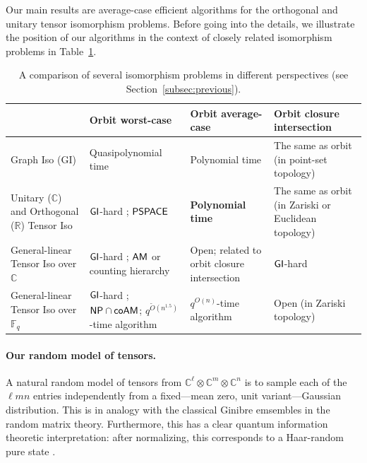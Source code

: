 \documentclass[11pt]{article}
\numberwithin{equation}{section}
\theoremstyle{remark}
\newcommand{\F}{\mathbb{F}}
\newcommand{\C}{\mathbb{C}}
\newcommand{\CC}{\mathbb{C}}
\newcommand{\RR}{\mathbb{R}}
\newcommand{\ccPSPACE}{\textsf{\upshape PSPACE}}
\newcommand{\ccNP}{\textsf{\upshape NP}}
\newcommand{\ccAM}{\textsf{\upshape AM}}
\newcommand{\cccoAM}{\textsf{\upshape coAM}}
\newcommand{\ccGI}{\textsf{\upshape GI}}
\begin{document}
Our main results are average-case efficient algorithms for the orthogonal and unitary tensor isomorphism problems. Before going into the details, we illustrate the position of our algorithms in the context of closely related isomorphism problems in Table~\ref{tab:comparison}.
\begin{table}[H]
\centering
\small
\setlength{\tabcolsep}{5pt}
\renewcommand{\arraystretch}{1.2}

\begin{tabularx}{\textwidth}{|
  >{\raggedright\arraybackslash}p{}|
  >{\raggedright\arraybackslash}p{}|
  >{\raggedright\arraybackslash}p{}|
  >{\raggedright\arraybackslash}p{}|}
\hline
 & \textbf{Orbit worst-case} & \textbf{Orbit average-case} & \textbf{Orbit closure intersection} \\
\hline
Graph Iso (GI) &
Quasipolynomial time \cite{Bab16} &
Polynomial time \cite{BES80,DBLP:conf/focs/BabaiK79,anastos2025smoothed} &
The same as orbit (in point-set topology) \\
\hline
Unitary ($\CC$) and Orthogonal ($\RR$) Tensor Iso &
$\ccGI$-hard \cite{TI3}; $\ccPSPACE$ &
\textbf{Polynomial time} &
The same as orbit (in Zariski or Euclidean topology) \\
\hline
General-linear Tensor Iso over $\C$ &
$\ccGI$-hard \cite{TI1};  $\ccAM$ \cite{koiran1996hilbert} or counting hierarchy \cite{AGS26} &
Open; related to orbit closure intersection &
$\ccGI$-hard \cite{lysikov2024complexity} \\
\hline
General-linear Tensor Iso over $\F_q$ &
$\ccGI$-hard \cite{TI1}; $\ccNP\cap\cccoAM$;
$q^{\tilde O(n^{1.5})}$-time algorithm \cite{Sun23,IMQSZ24}&
$q^{O(n)}$-time algorithm \cite{LQ17,BLQW20} &
Open (in Zariski topology) \\
\hline
\end{tabularx}
\caption{A comparison of several isomorphism problems in different perspectives (see Section~\ref{subsec:previous}).}
\label{tab:comparison}
\end{table}


\paragraph{Our random model of tensors.} A natural random model of tensors from $\CC^\ell\otimes\CC^m\otimes\CC^n$ is to sample each of the $\ell m n$ entries independently from a fixed---mean zero, unit variant---Gaussian distribution. This is in analogy with the classical Ginibre emsembles in the random matrix theory. Furthermore, this has a clear quantum information theoretic interpretation: after normalizing, this corresponds to a Haar-random pure state \cite{mezzadri2007generate}. 
\end{document}
